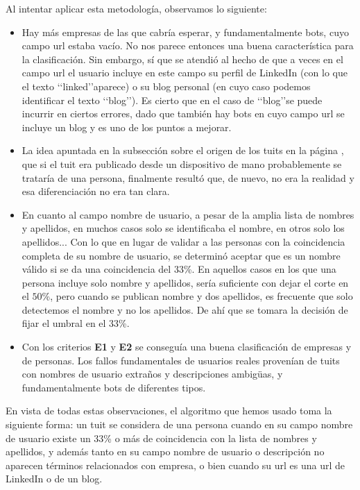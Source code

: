 Al intentar aplicar esta metodología, observamos lo siguiente:
\begin{itemize}
\item Hay más empresas de las que cabría esperar, y fundamentalmente bots, cuyo campo url estaba vacío. No
nos parece entonces una buena característica para la clasificación. Sin embargo, sí que se atendió al hecho 
de que a veces en el campo url el usuario incluye en este campo su perfil de LinkedIn (con lo que el
texto \lq\lq linked\rq\rq aparece) o su blog personal (en cuyo caso podemos identificar el texto 
\lq\lq blog\rq\rq). Es cierto que en el caso de \lq\lq blog\rq\rq se puede incurrir en ciertos errores,
dado que también hay bots en cuyo campo url se incluye un blog y es uno de los puntos a mejorar. 
\item La idea apuntada en la subsección sobre el origen de los tuits en la
página \pageref{subsubsect:origen_tuits}, que si el tuit era publicado desde un dispositivo de mano 
probablemente se trataría de una persona,  finalmente resultó que, de nuevo, no era la realidad y esa
diferenciación no era tan clara. 
\item En cuanto al campo nombre de usuario, a pesar de la amplia lista de nombres y apellidos,
en muchos casos solo se identificaba el nombre, en otros solo los apellidos... Con lo que en lugar de validar a las personas con la coincidencia completa de su nombre de usuario, se determinó 
aceptar que es un nombre válido si se da una coincidencia del $33$\%. En aquellos casos en los que una 
persona incluye solo nombre y apellidos, sería suficiente con dejar el corte en el $50$\%,
pero cuando se publican nombre y dos apellidos,  es frecuente que solo detectemos el nombre y no los apellidos. De ahí que se tomara la decisión de fijar el umbral en el $33$\%.
\item Con los criterios {\bf E1} y {\bf E2} se conseguía una buena clasificación de empresas y de personas. 
Los fallos fundamentales de usuarios reales provenían de tuits con nombres de usuario extraños y descripciones
ambigüas, y fundamentalmente bots de diferentes tipos.
\end{itemize}

En vista de todas estas observaciones, el algoritmo que hemos usado toma la siguiente forma:
un tuit se considera de una persona cuando en su campo nombre de usuario existe un $33$\% o más 
de coincidencia con la lista de nombres y apellidos, y además tanto en su campo nombre de usuario 
o descripción no aparecen términos relacionados con empresa, o bien cuando su url es una 
url de LinkedIn o de un blog.

